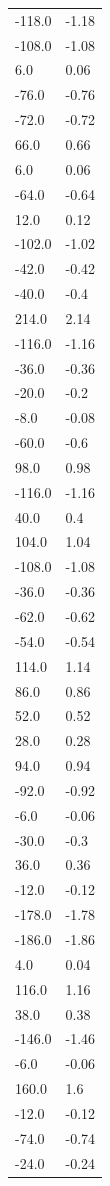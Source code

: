 \begin{longtable}{ll}
-118.0 & -1.18 \\
-108.0 & -1.08 \\
6.0 & 0.06 \\
-76.0 & -0.76 \\
-72.0 & -0.72 \\
66.0 & 0.66 \\
6.0 & 0.06 \\
-64.0 & -0.64 \\
12.0 & 0.12 \\
-102.0 & -1.02 \\
-42.0 & -0.42 \\
-40.0 & -0.4 \\
214.0 & 2.14 \\
-116.0 & -1.16 \\
-36.0 & -0.36 \\
-20.0 & -0.2 \\
-8.0 & -0.08 \\
-60.0 & -0.6 \\
98.0 & 0.98 \\
-116.0 & -1.16 \\
40.0 & 0.4 \\
104.0 & 1.04 \\
-108.0 & -1.08 \\
-36.0 & -0.36 \\
-62.0 & -0.62 \\
-54.0 & -0.54 \\
114.0 & 1.14 \\
86.0 & 0.86 \\
52.0 & 0.52 \\
28.0 & 0.28 \\
94.0 & 0.94 \\
-92.0 & -0.92 \\
-6.0 & -0.06 \\
-30.0 & -0.3 \\
36.0 & 0.36 \\
-12.0 & -0.12 \\
-178.0 & -1.78 \\
-186.0 & -1.86 \\
4.0 & 0.04 \\
116.0 & 1.16 \\
38.0 & 0.38 \\
-146.0 & -1.46 \\
-6.0 & -0.06 \\
160.0 & 1.6 \\
-12.0 & -0.12 \\
-74.0 & -0.74 \\
-24.0 & -0.24 \\

\end{longtable}
